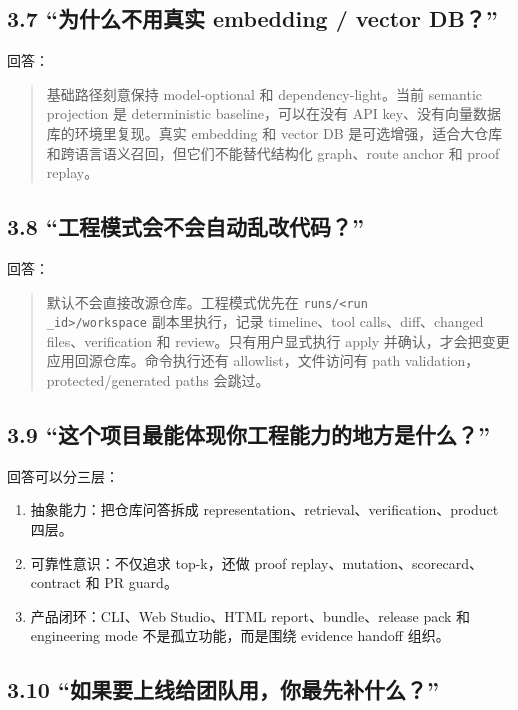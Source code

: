 \documentclass[UTF8,12pt,openany]{ctexbook}
\begin{document}
\subsection{3.7 “为什么不用真实 embedding / vector DB？”}

回答：\par

\begin{quote}
基础路径刻意保持 model-optional 和 dependency-light。当前 semantic projection 是 deterministic baseline，可以在没有 API key、没有向量数据库的环境里复现。真实 embedding 和 vector DB 是可选增强，适合大仓库和跨语言语义召回，但它们不能替代结构化 graph、route anchor 和 proof replay。
\end{quote}

\subsection{3.8 “工程模式会不会自动乱改代码？”}

回答：\par

\begin{quote}
默认不会直接改源仓库。工程模式优先在 \texttt{runs/<run\\_id>/workspace} 副本里执行，记录 timeline、tool calls、diff、changed files、verification 和 review。只有用户显式执行 apply 并确认，才会把变更应用回源仓库。命令执行还有 allowlist，文件访问有 path validation，protected/generated paths 会跳过。
\end{quote}

\subsection{3.9 “这个项目最能体现你工程能力的地方是什么？”}

回答可以分三层：\par

\begin{enumerate}
\item 抽象能力：把仓库问答拆成 representation、retrieval、verification、product 四层。
\item 可靠性意识：不仅追求 top-k，还做 proof replay、mutation、scorecard、contract 和 PR guard。
\item 产品闭环：CLI、Web Studio、HTML report、bundle、release pack 和 engineering mode 不是孤立功能，而是围绕 evidence handoff 组织。
\end{enumerate}

\subsection{3.10 “如果要上线给团队用，你最先补什么？”}
\end{document}

